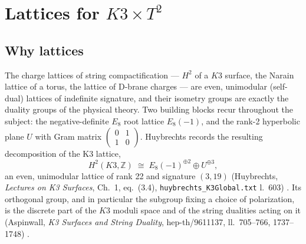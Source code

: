 \documentclass[11pt,a4paper]{article}
\theoremstyle{remark}
\begin{document}
\section{Lattices for $K3\times T^2$}
\label{sec:lattices}

\subsection{Why lattices}
The charge lattices of string compactification --- $H^2$ of a $K3$ surface, the Narain lattice of
a torus, the lattice of D-brane charges --- are even, unimodular (self-dual) lattices of
indefinite signature, and their isometry groups are exactly the duality groups of the physical
theory. Two building blocks recur throughout the subject: the negative-definite $E_8$ root
lattice $E_8(-1)$, and the rank-2 hyperbolic plane $U$ with Gram matrix
$\begin{pmatrix}0&1\\1&0\end{pmatrix}$. Huybrechts records the resulting decomposition of the K3
lattice,
\begin{equation}
  H^2(K3,\mathbb{Z}) \;\cong\; E_8(-1)^{\oplus 2}\oplus U^{\oplus 3},
\end{equation}
an even, unimodular lattice of rank 22 and signature $(3,19)$ (Huybrechts, \emph{Lectures on K3
Surfaces}, Ch.~1, eq.~(3.4), \texttt{huybrechts\_K3Global.txt} l.~603) \cite{Huybrechts}. Its
orthogonal group, and in particular the subgroup fixing a choice of polarization, is the discrete
part of the $K3$ moduli space and of the string dualities acting on it
(Aspinwall, \emph{K3 Surfaces and String Duality}, hep-th/9611137, ll.~705--766, 1737--1748)
\cite{Aspinwall1996}.
\end{document}
